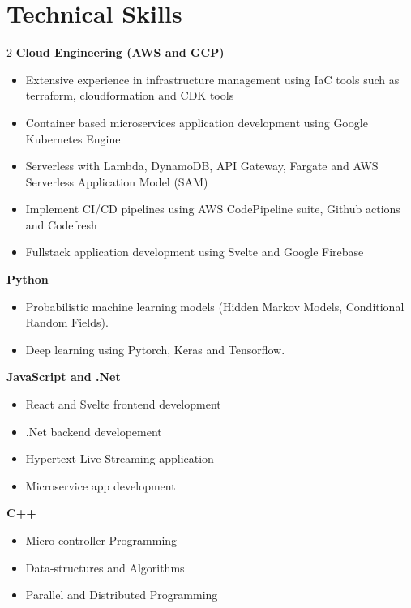 \documentclass[letterpaper,11pt]{article}
\newcommand{\resumeItem}[1]{
  \item\small{
    {#1 \vspace{-2pt}}
  }
}
\begin{document}
\section{Technical Skills}
\setlength{\multicolsep}{0.0pt plus 0pt minus 0pt}
    \begin{multicols}{2}
        {\textbf{Cloud Engineering (AWS and GCP)}}{}
        \vspace{-4pt}
        \begin{itemize}[itemsep=0pt]
          \resumeItem{Extensive experience in infrastructure management using IaC tools such as terraform, cloudformation and CDK tools}  
          \resumeItem{Container based microservices application development using Google Kubernetes Engine}
          \resumeItem{Serverless with Lambda, DynamoDB, API Gateway, Fargate and AWS Serverless Application Model (SAM)}
          \resumeItem{Implement CI/CD pipelines using AWS CodePipeline suite, Github actions and Codefresh}
          \resumeItem{Fullstack application development using Svelte and Google Firebase}
        \end{itemize}

        {\textbf{Python}}{}
        \vspace{-4pt}
        \begin{itemize}[itemsep=0pt]
          \resumeItem{Probabilistic machine learning models (Hidden Markov Models, Conditional Random Fields).}
          \resumeItem{Deep learning using Pytorch, Keras and Tensorflow.}
        \end{itemize}

        {\textbf{JavaScript and .Net}}{}
        \vspace{-4pt}
        \begin{itemize}[itemsep=0pt]
          \resumeItem{React and Svelte frontend development}  
          \resumeItem{.Net backend developement}  
          \resumeItem{Hypertext Live Streaming application}
          \resumeItem{Microservice app development}
        \end{itemize}

        {\textbf{C++}}{}
        \vspace{-4pt}
        \begin{itemize}[itemsep=0pt]
          \resumeItem{Micro-controller Programming}
          \resumeItem{Data-structures and Algorithms}
          \resumeItem{Parallel and Distributed Programming}
        \end{itemize}
  \end{multicols}
\end{document}
